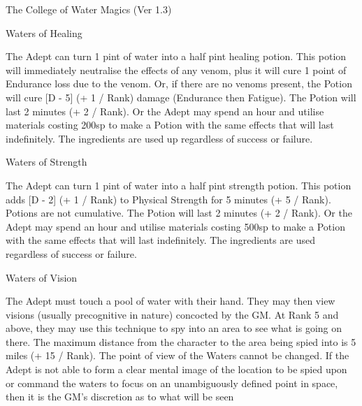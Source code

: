 \begin{Chapter}{The College of Water Magics (Ver 1.3)}
\begin{spell}[S-11]{Waters of Healing}

\begin{effects}
The Adept can turn 1 pint of water into a half pint healing potion.
This potion will immediately neutralise the effects of any venom, plus
it will cure 1 point of Endurance loss due to the venom.  Or, if there
are no venoms present, the Potion will cure [D - 5] (+ 1 / Rank)
damage (Endurance then Fatigue).  The Potion will last 2 minutes (+ 2
/ Rank). Or the Adept may spend an hour and utilise materials costing
200sp to make a Potion with the same effects that will last
indefinitely.  The ingredients are used up regardless of success or
failure.
\end{effects}
\end{spell}

\begin{spell}[S-12]{Waters of Strength}

\begin{effects}
The Adept can turn 1 pint of water into a half pint strength potion.
This potion adds [D - 2] (+ 1 / Rank) to Physical Strength for 5
minutes (+ 5 / Rank).  Potions are not cumulative.  The Potion will
last 2 minutes (+ 2 / Rank). Or the Adept may spend an hour and
utilise materials costing 500sp to make a Potion with the same effects
that will last indefinitely. The ingredients are used regardless of
success or failure.
\end{effects}
\end{spell}

\begin{spell}[S-13]{Waters of Vision}

\begin{effects}
The Adept must touch a pool of water with their hand.  They may then
view visions (usually precognitive in nature) concocted by the GM.  At
Rank 5 and above, they may use this technique to spy into an area to
see what is going on there. The maximum distance from the character to
the area being spied into is 5 miles (+ 15 / Rank). The point of view
of the Waters cannot be changed.  If the Adept is not able to form a
clear mental image of the location to be spied upon or command the
waters to focus on an unambiguously defined point in space, then it is
the GM’s discretion as to what will be seen
\end{effects}
\end{spell}


\end{Chapter}
